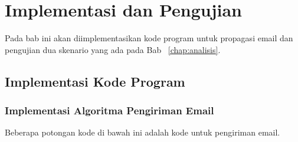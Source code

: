 \chapter{Implementasi dan Pengujian}
\label{chap:implementasipengujian}
Pada bab ini akan diimplementasikan kode program untuk propagasi email dan pengujian dua skenario yang ada pada Bab ~\ref{chap:analisis}.
\section{Implementasi Kode Program}
\label{sec:kodeprogram}

\subsection{Implementasi Algoritma Pengiriman Email}
\label{implementasialgo}
Beberapa potongan kode di bawah ini adalah kode untuk pengiriman email.
